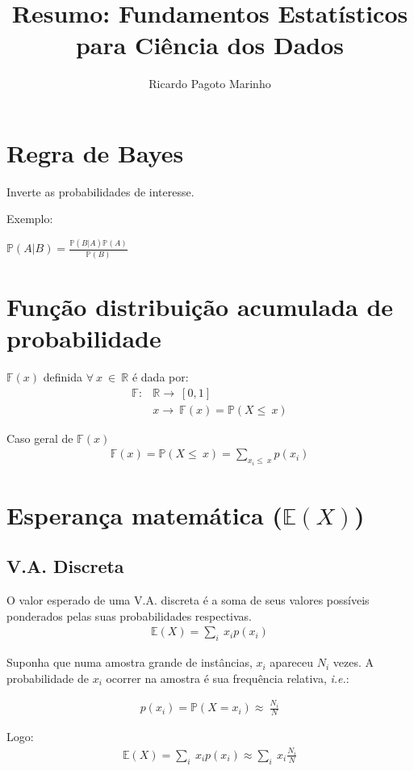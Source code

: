\documentclass[11pt,a4paper]{article}
\title{Resumo: Fundamentos Estatísticos para Ciência dos Dados}
\author{Ricardo Pagoto Marinho}
\begin{document}
\maketitle
	\section{Regra de Bayes}
	Inverte as probabilidades de interesse.
	
	Exemplo:
	
	$\mathbb{P}(A|B) = \frac{\mathbb{P}(B|A)\mathbb{P}(A)}{\mathbb{P}(B)}$
	
	\section{Função distribuição acumulada de probabilidade}
	$\mathbb{F}(x)$ definida $\forall~x~\in~\mathbb{R}$ é dada por:
	\begin{align*}
		\mathbb{F}: & \mathbb{R}\rightarrow~[0,1]\\
		& x\rightarrow~\mathbb{F}(x)=\mathbb{P}(X\leq~x)
	\end{align*}
		
	Caso geral de $\mathbb{F}(x)$
	\begin{align*}
		\mathbb{F}(x)=\mathbb{P}(X\leq~x)=\sum_{x_i\leq~x}p(x_i)
	\end{align*}
		
	\section{Esperança matemática ($\mathbb{E}(X)$)}
		
		\subsection{V.A. Discreta}
			O valor esperado de uma V.A. discreta é a soma de seus valores possíveis ponderados pelas suas probabilidades respectivas.
			\begin{align*}
				\mathbb{E}(X)=\sum_i~x_ip(x_i)
			\end{align*}
	
			Suponha que numa amostra grande de instâncias, $x_i$ apareceu $N_i$ vezes.
			A probabilidade de $x_i$ ocorrer na amostra é sua frequência relativa, \textit{i.e.}:
		
			\begin{align*}
				p(x_i)=\mathbb{P}(X=x_i)\approx~\frac{N_i}{N}
			\end{align*}
		
			Logo:
			\begin{align*}
				\mathbb{E}(X)=\sum_i~x_ip(x_i)\approx \sum_i~x_i\frac{N_i}{N}
			\end{align*}
		
\end{document}
